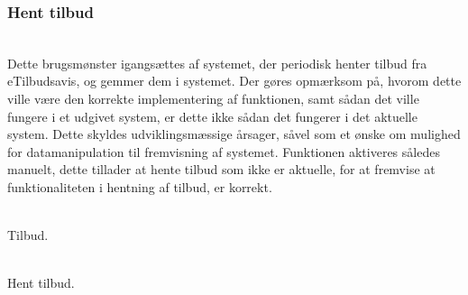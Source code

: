 \subsubsection{Hent tilbud}
\vspace{-6pt}
\begin{description}[font=\normalfont\itshape]
\item[Brugsmønster]\hfill\\
Dette brugsmønster igangsættes af systemet, der periodisk henter tilbud fra eTilbudsavis, og gemmer dem i systemet.
Der gøres opmærksom på, hvorom dette ville være den korrekte implementering af funktionen, samt sådan det ville fungere i et udgivet system, er dette ikke sådan det fungerer i det aktuelle system.
Dette skyldes udviklingsmæssige årsager, såvel som et ønske om mulighed for datamanipulation til fremvisning af systemet.
Funktionen aktiveres således manuelt, dette tillader at hente tilbud som ikke er aktuelle, for at fremvise at funktionaliteten i hentning af tilbud, er korrekt.
\item[Objekter]\hfill\\
Tilbud.
\item[Funktioner]\hfill\\
Hent tilbud.
\end{description}

